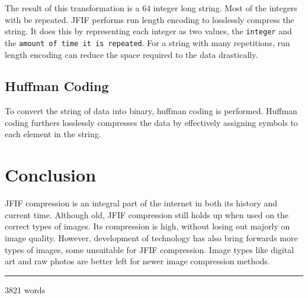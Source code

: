 \documentclass{article}
\begin{document}
The result of this transformation is a 64 integer long string.
Most of the integers with be repeated.
JFIF performs run length encoding to losslessly compress the string.
It does this by representing each integer as two values, the \texttt{integer} and the \texttt{amount of time it is repeated}.
For a string with many repetitions, run length encoding can reduce the space required to the data drastically.

\subsection{Huffman Coding}\label{huffman}
To convert the string of data into binary, huffman coding is performed.
Huffman coding furthers losslessly compresses the data by effectively assigning symbols to each element in the string.

% 
% 
% 
% 

\section{Conclusion}
JFIF compression is an integral part of the internet in both its history and current time.
Although old, JFIF compression still holds up when used on the correct types of images.
Its compression is high, without losing out majorly on image quality.
However, development of technology has also bring forwards more types of images, some unsuitable for JFIF compression.
Image types like digital art and raw photos are better left for newer image compression methods.

\vspace{1em}
\hrule
\vspace{1em}

3821 words

\newpage
\printbibliography
\end{document}
